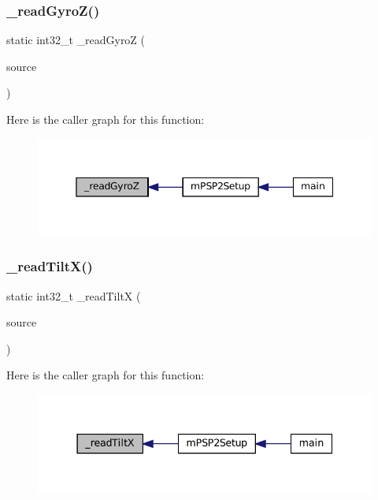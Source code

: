 \subsubsection{\texorpdfstring{\+\_\+read\+Gyro\+Z()}{\_readGyroZ()}}
{\footnotesize\ttfamily static int32\+\_\+t \+\_\+read\+GyroZ (\begin{DoxyParamCaption}\item[{struct m\+Rotation\+Source $\ast$}]{source }\end{DoxyParamCaption})\hspace{0.3cm}{\ttfamily [static]}}

Here is the caller graph for this function\+:
\nopagebreak
\begin{figure}[H]
\begin{center}
\leavevmode
\includegraphics[width=345pt]{psp2-context_8c_aa764e37dc09625e703361dd3deb193ed_icgraph}
\end{center}
\end{figure}
\mbox{\label{psp2-context_8c_a6d9f679bac5e9209e4c39c332067448f}} 
\subsubsection{\texorpdfstring{\+\_\+read\+Tilt\+X()}{\_readTiltX()}}
{\footnotesize\ttfamily static int32\+\_\+t \+\_\+read\+TiltX (\begin{DoxyParamCaption}\item[{struct m\+Rotation\+Source $\ast$}]{source }\end{DoxyParamCaption})\hspace{0.3cm}{\ttfamily [static]}}

Here is the caller graph for this function\+:
\nopagebreak
\begin{figure}[H]
\begin{center}
\leavevmode
\includegraphics[width=337pt]{psp2-context_8c_a6d9f679bac5e9209e4c39c332067448f_icgraph}
\end{center}
\end{figure}
\mbox{\label{psp2-context_8c_a483456c7f026a79ac8b6f9f6bb3349e3}} 
